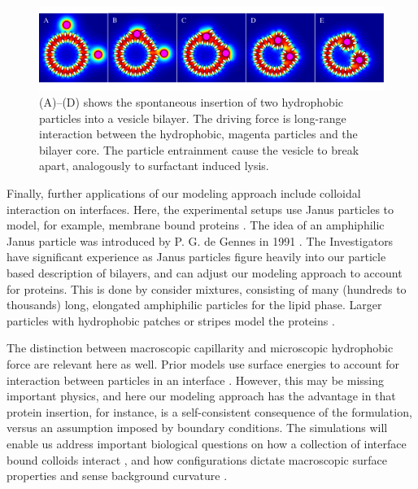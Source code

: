 \begin{figure}
\begin{center}
\includegraphics[width=\textwidth]{figures/SA3_fig1.pdf}
\end{center}
\caption{(A)--(D) shows the spontaneous insertion of two hydrophobic particles into a vesicle bilayer. 
The driving force is long-range interaction between the hydrophobic, magenta particles and
the bilayer core.  The particle entrainment cause the vesicle to break apart, analogously to surfactant
induced lysis.}
\end{figure}
Finally, further applications of our modeling approach include colloidal interaction on interfaces. Here, the experimental setups use Janus particles to model, for example, membrane bound proteins \cite{Kumar2013,Lehle2008,Zhang2017}. The idea of an amphiphilic Janus particle was introduced by P. G. de Gennes in 1991 \cite{Zhang2017}. The Investigators have significant experience as Janus particles figure heavily into our particle based description of bilayers, and can adjust our modeling approach to account for proteins. This is done by consider mixtures, consisting of many (hundreds to thousands) long, elongated amphiphilic particles for the lipid phase. Larger particles with hydrophobic patches or stripes model the proteins \cite{Jurasek2017}.

The distinction between macroscopic capillarity and microscopic hydrophobic force are relevant here as well.  Prior models use surface energies to account for interaction between particles in an interface \cite{Dasgupta2017}. 
However, this may be missing important physics, and here our modeling approach has the advantage in that protein insertion, for instance, is a self-consistent consequence of the formulation, versus an assumption imposed by boundary conditions.  
The simulations will enable us address important biological questions on how a collection of 
interface bound colloids interact \cite{Yao2013,Salib2013}, 
and how configurations dictate 
macroscopic surface properties and sense background curvature \cite{Cavallaro2011,Liu2018,Sharifi-Mood2015}. 


